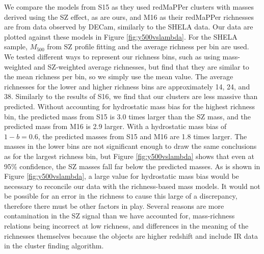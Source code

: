 \documentclass[a4paper,fleqn,usenatbib]{mnras}
\begin{document}
We compare the models from S15 as they used redMaPPer clusters with masses derived using the SZ effect, as are ours, and M16 as their redMaPPer richnesses are from data observed by DECam, similarly to the SHELA data. Our data are plotted against these models in Figure \ref{fig:y500vslambda}. For the SHELA sample, $M_{500}$ from SZ profile fitting and the average richness per bin are used. We tested different ways to represent our richness bins, such as using mass-weighted and SZ-weighted average richnesses, but find that they are similar to the mean richness per bin, so we simply use the mean value. The average richnesses for the lower and higher richness bins are approximately 14, 24, and 38. Similarly to the results of S16, we find that our clusters are less massive than predicted. 
Without accounting for hydrostatic mass bias for the highest richness bin, the predicted mass from S15 is 3.0 times larger than the SZ mass, and the predicted mass from M16 is 2.9 larger. With a hydrostatic mass bias of $1-b = 0.6$, the predicted masses from S15 and M16 are 1.8 times larger. The masses in the lower bins are not significant enough to draw the same conclusions as for the largest richness bin, but Figure \ref{fig:y500vslambda} shows that even at 95\% confidence, the SZ masses fall far below the predicted masses. 
As is shown in Figure \ref{fig:y500vslambda}, a large value for hydrostatic mass bias would be necessary to reconcile our data with the richness-based mass models. It would not be possible for an error in the richness to cause this large of a discrepancy, therefore there must be other factors in play. Several reasons are more contamination in the SZ signal than we have accounted for, mass-richness relations being incorrect at low richness, and differences in the meaning of the richnesses themselves because the objects are higher redshift and include IR data in the cluster finding algorithm.


\end{document}
